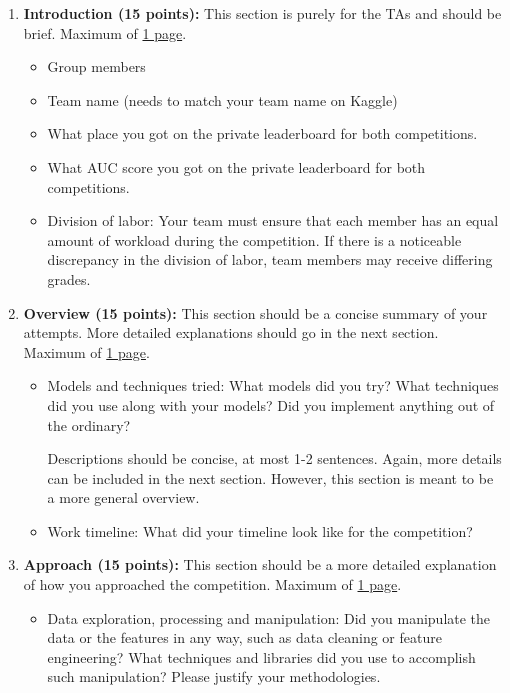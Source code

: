 \begin{enumerate}
    \item \textbf{Introduction (15 points):} This section is purely for the TAs and should be brief. Maximum of \underline{1 page}.
    \begin{itemize}
        \item Group members
        \item Team name (needs to match your team name on Kaggle)
        \item What place you got on the private leaderboard for both competitions.
        \item What AUC score you got on the private leaderboard for both competitions.
        \item Division of labor: Your team must ensure that each member has an equal amount of workload during the competition. If there is a noticeable discrepancy in the division of labor, team members may receive differing grades.
    \end{itemize}

    \item \textbf{Overview (15 points):} This section should be a concise summary of your attempts. More detailed explanations should go in the next section. Maximum of \underline{1 page}.
    \begin{itemize}
        \item Models and techniques tried: What models did you try? What techniques did you use along with your models? Did you implement anything out of the ordinary?

        Descriptions should be concise, at most 1-2 sentences. Again, more details can be included in the next section. However, this section is meant to be a more general overview.

        \item Work timeline: What did your timeline look like for the competition?
    \end{itemize}

    \item \textbf{Approach (15 points):} This section should be a more detailed explanation of how you approached the competition. Maximum of \underline{1 page}.
    \begin{itemize}
        \item Data exploration, processing and manipulation: Did you manipulate the data or the features in any way, such as data cleaning or feature engineering? What techniques and libraries did you use to accomplish such manipulation? Please justify your methodologies.


\end{itemize}
\end{enumerate}
